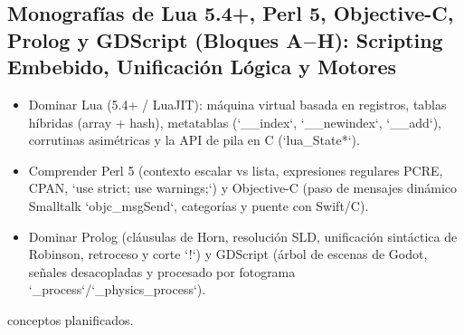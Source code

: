 \documentclass{book}
\begin{document}
\subsection*{\checkmark Monografías de Lua 5.4+, Perl 5, Objective-C, Prolog y GDScript (Bloques A\(-\)H): Scripting Embebido, Unificación Lógica y Motores}
\begin{itemize}
\item Dominar Lua (5.4+ / LuaJIT): máquina virtual basada en registros, tablas híbridas (array + hash), metatablas (`\_\_index`, `\_\_newindex`, `\_\_add`), corrutinas asimétricas y la API de pila en C (`lua\_State*`).
\item Comprender Perl 5 (contexto escalar vs lista, expresiones regulares PCRE, CPAN, `use strict; use warnings;`) y Objective-C (paso de mensajes dinámico Smalltalk `objc\_msgSend`, categorías y puente con Swift/C).
\item Dominar Prolog (cláusulas de Horn, resolución SLD, unificación sintáctica de Robinson, retroceso y corte `!`) y GDScript (árbol de escenas de Godot, señales desacopladas y procesado por fotograma `\_process`/`\_physics\_process`).
\end{itemize}
 conceptos planificados.
\backmatter
\end{document}
